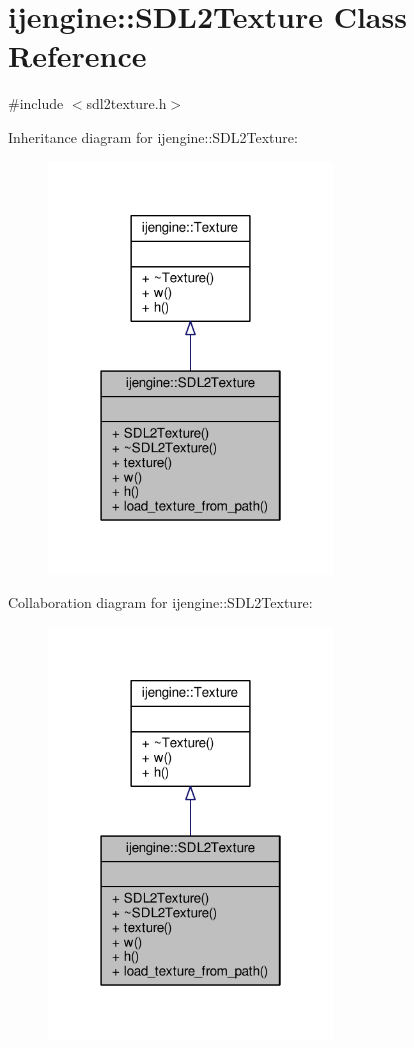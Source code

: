 \hypertarget{classijengine_1_1SDL2Texture}{\section{ijengine\-:\-:S\-D\-L2\-Texture Class Reference}
\label{classijengine_1_1SDL2Texture}
}


{\ttfamily \#include $<$sdl2texture.\-h$>$}



Inheritance diagram for ijengine\-:\-:S\-D\-L2\-Texture\-:\nopagebreak
\begin{figure}[H]
\begin{center}
\leavevmode
\includegraphics[width=214pt]{classijengine_1_1SDL2Texture__inherit__graph}
\end{center}
\end{figure}


Collaboration diagram for ijengine\-:\-:S\-D\-L2\-Texture\-:\nopagebreak
\begin{figure}[H]
\begin{center}
\leavevmode
\includegraphics[width=214pt]{classijengine_1_1SDL2Texture__coll__graph}
\end{center}
\end{figure}
